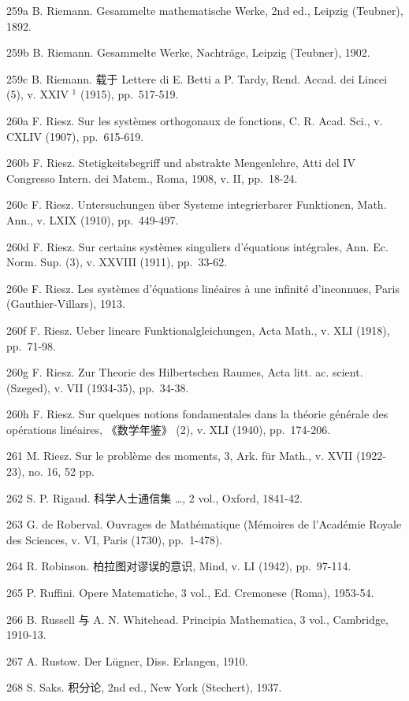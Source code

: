 259a B. Riemann. Gesammelte mathematische Werke, 2nd ed., Leipzig (Teubner), 1892.

259b B. Riemann. Gesammelte Werke, Nachträge, Leipzig (Teubner), 1902.

259c B. Riemann. 载于 Lettere di E. Betti a P. Tardy, Rend. Accad. dei Lincei (5), v. XXIV \(^{1}\) (1915), pp.~517-519.

260a F. Riesz. Sur les systèmes orthogonaux de fonctions, C. R. Acad. Sci., v. CXLIV (1907), pp.~615-619.

260b F. Riesz. Stetigkeitsbegriff und abstrakte Mengenlehre, Atti del IV Congresso Intern. dei Matem., Roma, 1908, v. II, pp.~18-24.

260c F. Riesz. Untersuchungen über Systeme integrierbarer Funktionen, Math. Ann., v. LXIX (1910), pp.~449-497.

260d F. Riesz. Sur certains systèmes singuliers d'équations intégrales, Ann. Ec. Norm. Sup. (3), v. XXVIII (1911), pp.~33-62.

260e F. Riesz. Les systèmes d'équations linéaires à une infinité d'inconnues, Paris (Gauthier-Villars), 1913.

260f F. Riesz. Ueber lineare Funktionalgleichungen, Acta Math., v. XLI (1918), pp.~71-98.

260g F. Riesz. Zur Theorie des Hilbertschen Raumes, Acta litt. ac. scient. (Szeged), v. VII (1934-35), pp.~34-38.

260h F. Riesz. Sur quelques notions fondamentales dans la théorie générale des opérations linéaires, 《数学年鉴》 (2), v. XLI (1940), pp.~174-206.

261 M. Riesz. Sur le problème des moments, 3, Ark. für Math., v. XVII (1922-23), no. 16, 52 pp.

262 S. P. Rigaud. 科学人士通信集 \ldots, 2 vol., Oxford, 1841-42.

263 G. de Roberval. Ouvrages de Mathématique (Mémoires de l'Académie Royale des Sciences, v. VI, Paris (1730), pp.~1-478).

264 R. Robinson. 柏拉图对谬误的意识, Mind, v. LI (1942), pp.~97-114.

265 P. Ruffini. Opere Matematiche, 3 vol., Ed. Cremonese (Roma), 1953-54.

266 B. Russell 与 A. N. Whitehead. Principia Mathematica, 3 vol., Cambridge, 1910-13.

267 A. Rustow. Der Lügner, Diss. Erlangen, 1910.

268 S. Saks. 积分论, 2nd ed., New York (Stechert), 1937.


